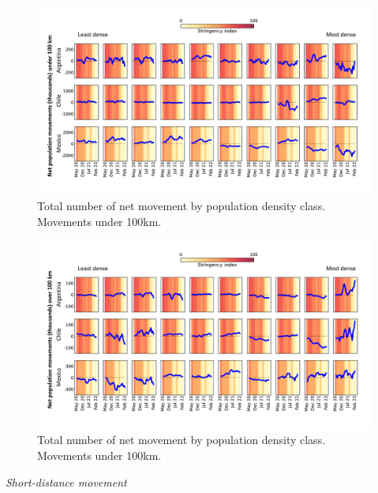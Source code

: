 \documentclass[
  10pt,
  letterpaper,
  DIV=11,
  numbers=noendperiod]{scrartcl}
\begin{document}
\begin{figure}

{\centering \includegraphics{./outputs/netflows_u100_0km_format_report_minus_Colombia.pdf}

}

\caption{\label{fig-fig4}Total number of net movement by population
density class. Movements under 100km.}

\end{figure}

\begin{figure}

{\centering \includegraphics{./outputs/netflows_o100_0km_format_report_minus_Colombia.pdf}

}

\caption{\label{fig-fig5}Total number of net movement by population
density class. Movements under 100km.}

\end{figure}

\emph{Short-distance movement}
\end{document}
